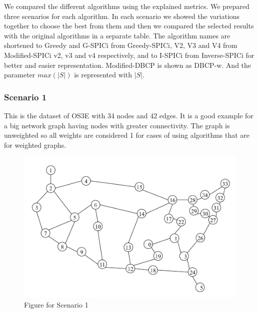 \documentclass[8pt]{extarticle}
\begin{document}
	We compared the different algorithms using the explained metrics. We prepared three scenarios for each algorithm. In each scenario we showed the variations together to choose the best from them and then we compared the selected results with the original algorithms in a separate table. The algorithm names are shortened to Greedy and G-SPICi from Greedy-SPICi, V2, V3 and V4 from Modified-SPICi v2, v3 and v4 respectively, and to I-SPICi from Inverse-SPICi for better and easier representation. Modified-DBCP is shown as DBCP-w. And the parameter $max(|S|)$ is represented with $|S|$.
	\subsubsection{Scenario 1}
	This is the dataset of OS3E with 34 nodes and 42 edges. It is a good example for a big network graph having nodes with greater connectivity. The graph is unweighted so all weights are considered 1 for cases of using algorithms that are for weighted graphs.
	\begin{figure}
		\includegraphics[width=\linewidth]{OS3E.png}
		\caption{Figure for Scenario 1}
		\label{fig:os3e}
	\end{figure}
\end{document}
